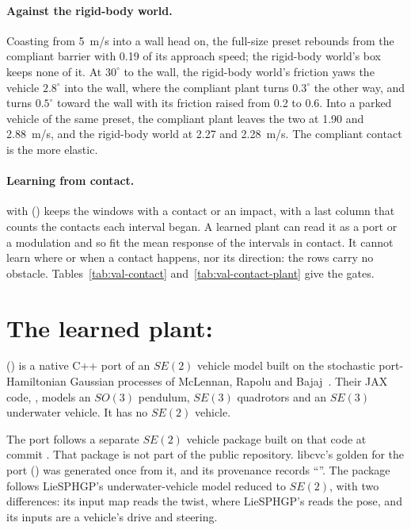 \documentclass[11pt]{article}
\theoremstyle{remark}
\begin{document}
\paragraph{Against the rigid-body world.} Coasting from 5~m/s into a wall head on, the full-size
preset rebounds from the compliant barrier with 0.19 of its approach speed; the rigid-body world's
box keeps none of it. At $30^\circ$ to the wall, the rigid-body world's friction yaws the vehicle
$2.8^\circ$ into the wall, where the compliant plant turns $0.3^\circ$ the other way, and turns
$0.5^\circ$ toward the wall with its friction raised from 0.2 to 0.6. Into a parked vehicle of the
same preset, the compliant plant leaves the two at 1.90 and 2.88~m/s, and the rigid-body world at
2.27 and 2.28~m/s. The compliant contact is the more elastic.

\paragraph{Learning from contact.}  with  () keeps the windows with a contact or an impact, with a last column that
counts the contacts each interval began. A learned plant can read it as a port or a modulation and
so fit the mean response of the intervals in contact. It cannot learn where or when a contact
happens, nor its direction: the rows carry no obstacle. Tables~\ref{tab:val-contact}
and~\ref{tab:val-contact-plant} give the gates.

\section{The learned plant: \texorpdfstring{}{cvc::ph}}
\label{sec:learned}

 () is a native C++ port of an
$SE(2)$ vehicle model built on the stochastic port-Hamiltonian Gaussian processes of McLennan,
Rapolu and Bajaj~\cite{liesphgp2026}. Their JAX code, , models an $SO(3)$
pendulum, $SE(3)$ quadrotors and an $SE(3)$ underwater vehicle. It has no $SE(2)$ vehicle.

The port follows a separate $SE(2)$ vehicle package built on that code at commit .
That package is not part of the public repository. libcvc's golden for the port
() was generated once from it, and its provenance records
``''. The package follows LieSPHGP's
underwater-vehicle model reduced to $SE(2)$, with two differences: its input map reads the twist,
where LieSPHGP's reads the pose, and its inputs are a vehicle's drive and steering.
\end{document}
